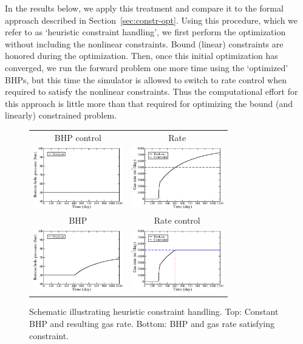 \documentclass[twocolumn,numbook]{svjour3}          %
\begin{document}
In the results below, we apply this treatment and compare it to the formal
approach described in Section~\ref{sec:constr-opt}. Using this procedure, which
we refer to as `heuristic constraint handling', we first perform the
optimization without including the nonlinear constraints. Bound (linear)
  constraints are honored during the optimization. Then, once this initial
  optimization has converged, we run the forward problem one more time using the
  `optimized' BHPs, but this time the simulator is allowed to switch to rate
  control when required to satisfy the nonlinear constraints. Thus the
  computational effort for this approach is little more than that required for
  optimizing the bound (and linearly) constrained problem.



\begin{figure}[ht]
\begin{center}
  \begin{tabular}{cc}
    BHP control & Rate \\
    \includegraphics[height=2.7cm]{SimpleBHP_BHP.pdf}
    &
    \includegraphics[height=2.7cm]{SimpleBHP_rate_gas.pdf} \\
    BHP & Rate control \\
    \includegraphics[height=2.7cm]{SimpleRate_BHP.pdf}
    &
    \includegraphics[height=2.7cm]{SimpleRate_rate_gas.pdf} \\
  \end{tabular}
\end{center}
     \caption{Schematic illustrating heuristic constraint handling. Top: Constant BHP and resulting gas rate. Bottom: BHP and gas rate satisfying constraint.}
\label{fig:BHPvsRateControl}
\end{figure}
\end{document}

